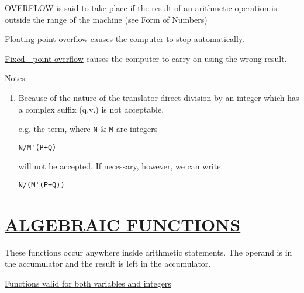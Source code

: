 \documentclass[10pt, a4paper, oneside]{article}
\newcommand{\myuline}[1]{\uline{#1}}
\newcommand{\mytt}[1]{\texttt{\scriptsize #1}}
\newcommand{\mytt}[1]{\texttt{\small #1}}
\begin{document}
\begin{multicols}{2}
\begin{flushleft}
\myuline{OVERFLOW} is said to take place if the result of an
arithmetic operation is outside the range of the machine
(see Form of Numbers)

\myuline{Floating-point overflow} causes the computer to stop
automatically.

\myuline{Fixed—point overflow} causes the computer to carry on
using the wrong result.

\myuline{Notes}
\end{flushleft}

\renewcommand{\labelenumi}{(\theenumi)}
\begin{enumerate}

\item Because of the nature of the translator direct
\myuline{division} by an integer which has a complex suffix
(q.v.) is not acceptable.

e.g. the term, where \mytt{N} \& \mytt{M} are integers

\begin{addmargin}[1cm]{1em}%
\begin{lstlisting}
N/M'(P+Q)
\end{lstlisting}
\end{addmargin}

will \myuline{not} be accepted.
If necessary, however, we
can write

\begin{addmargin}[1cm]{1em}%
\begin{lstlisting}
N/(M'(P+Q))
\end{lstlisting}
\end{addmargin}

\end{enumerate}


\section{\myuline{ALGEBRAIC FUNCTIONS}}

These functions occur anywhere inside arithmetic
statements.  The operand is in the accumulator and the
result is left in the accumulator.

\renewcommand{\labelenumi}{\alph{enumi})}
\begin{enumerate}
\def\theenumi{\alph{enumi}}

\begin{minipage}{\columnwidth}
\item\label{it:AFBOTH} \myuline{Functions valid for both variables and integers}


\end{minipage}
\end{enumerate}
\end{multicols}
\end{document}
